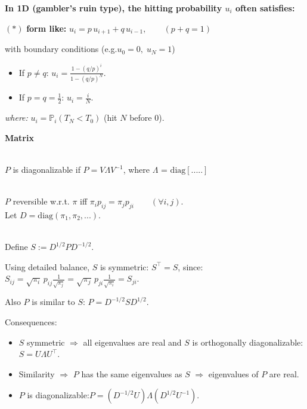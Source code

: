 \documentclass[a4paper, landscape]{article}
\newcommand{\topic}[1]{\par\medskip\textbf{#1}\par}
\newcommand{\subtopic}[1]{\par\textbf{#1}}
\renewcommand{\topic}[1]{\par\medskip\noindent\colorbox{highlightcolor}{\parbox{\dimexpr\columnwidth-2\fboxsep\relax}{\textbf{#1}}}\par}
\renewcommand{\subtopic}[1]{\par\textbf{\color{blue}{#1}}} %
\begin{document}
\begin{multicols}{4}
\subtopic{Random Walk Hitting Probability}
\textbf{In 1D (gambler's ruin type), the hitting probability $u_i$ often satisfies:}\\ 
\par $(*)$ \textbf{form like:} $u_i = p\,u_{i+1} + q\,u_{i-1}, \qquad (p+q=1)$

with boundary conditions (e.g.$u_0=0,\; u_N=1$)
\begin{itemize}
  \item If $p\neq q$:
    $ u_i=\frac{1-(q/p)^i}{1-(q/p)^N}$.

  \item If $p=q=\tfrac12$: $u_i=\frac{i}{N}.$

\end{itemize}

\emph{where:} $u_i=\mathbb P_i(T_N<T_0)$ (hit $N$ before $0$).
\vspace{10cm}



\topic{Matrix}
\subtopic{Diagonalizable:}\\
$P$ is diagonalizable if $P=V \Lambda V^{-1}$, where $\Lambda$ = $\text{diag}[.....]$
\subtopic{Reversibility (Detailed Balance)}\\
$P$ reversible w.r.t. $\pi$ iff $\pi_i p_{ij}=\pi_j p_{ji}\qquad(\forall i,j).$\\
Let $D=\mathrm{diag}(\pi_1,\pi_2,...)$.

\subtopic{Key Symmetrization Trick}\\
Define $S:=D^{1/2} P D^{-1/2}.$

Using detailed balance, $S$ is symmetric:
$S^\top=S$, since:\\
$S_{ij}=\sqrt{\pi_i}\,p_{ij}\frac{1}{\sqrt{\pi_j}}
      =\sqrt{\pi_j}\,p_{ji}\frac{1}{\sqrt{\pi_i}}=S_{ji}.$

Also $P$ is similar to $S$: $P=D^{-1/2} S D^{1/2}.$

Consequences:
\begin{itemize}\itemsep1pt
  \item $S$ symmetric $\Rightarrow$ all eigenvalues are real and $S$ is orthogonally diagonalizable: $S=U\Lambda U^\top$.
  \item Similarity $\Rightarrow$ $P$ has the same eigenvalues as $S$ $\Rightarrow$ eigenvalues of $P$ are real.
  \item $P$ is diagonalizable:$P=(D^{-1/2}U)\Lambda(D^{1/2}U^{-1})$.
\end{itemize}


\end{multicols}
\end{document}
